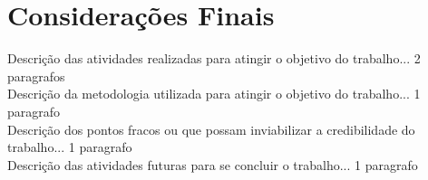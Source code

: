 \chapter{Considerações Finais}

Descrição das atividades realizadas para atingir o objetivo do trabalho... 2 paragrafos \\
Descrição da metodologia utilizada para atingir o objetivo do trabalho... 1 paragrafo \\
Descrição dos pontos fracos ou que possam inviabilizar a credibilidade do trabalho... 1 paragrafo \\
Descrição das atividades futuras para se concluir o trabalho... 1 paragrafo